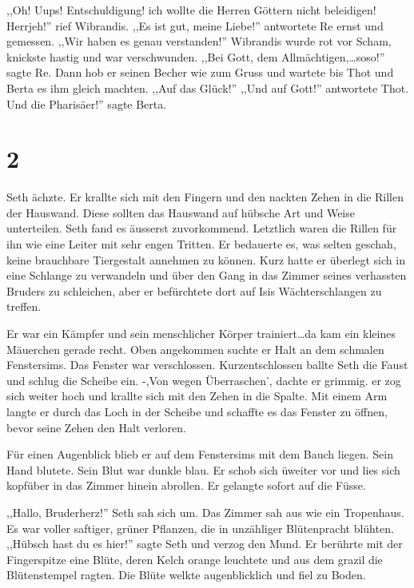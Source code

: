 \documentclass[11pt,titlepage,a5paper]{book}
\begin{document}
,,Oh! Uups! Entschuldigung! ich wollte die Herren Göttern nicht beleidigen! Herrjeh!'' rief Wibrandis. ,,Es ist gut, meine Liebe!'' antwortete Re ernst und gemessen. ,,Wir haben es genau verstanden!'' Wibrandis wurde rot vor Scham, knickste hastig und war verschwunden. ,,Bei Gott, dem Allmächtigen,\dots soso!'' sagte Re. Dann hob er seinen Becher wie zum Gruss und wartete bis Thot und Berta es ihm gleich machten. ,,Auf das Glück!'' ,,Und auf Gott!'' antwortete Thot. Und die Pharisäer!'' sagte Berta.

\section*{2}

Seth ächzte. Er krallte sich mit den Fingern und den nackten Zehen in die Rillen der Hauswand. Diese sollten das Hauswand auf hübsche Art und Weise unterteilen. Seth fand es äusserst zuvorkommend. Letztlich waren die Rillen für ihn wie eine Leiter mit sehr engen Tritten. Er bedauerte es, was selten geschah, keine brauchbare Tiergestalt annehmen zu können. Kurz hatte er überlegt sich in eine Schlange zu verwandeln und über den Gang in das Zimmer seines verhassten Bruders zu schleichen, aber er befürchtete dort auf Isis Wächterschlangen zu treffen.

Er war ein Kämpfer und sein menschlicher Körper trainiert\dots da kam ein kleines Mäuerchen gerade recht. Oben angekommen suchte er Halt an dem schmalen Fenstersims. Das Fenster war verschlossen. Kurzentschlossen ballte Seth die Faust und schlug die Scheibe ein. -,Von wegen Überraschen', dachte er grimmig. er zog sich weiter hoch und krallte sich mit den Zehen in die Spalte. Mit einem Arm langte er durch das Loch in der Scheibe und schaffte es das Fenster zu öffnen, bevor seine Zehen den Halt verloren.

Für einen Augenblick blieb er auf dem Fenstersims mit dem Bauch liegen. Sein Hand blutete. Sein Blut war dunkle blau. Er schob sich üweiter vor und lies sich kopfüber in das Zimmer hinein abrollen. Er gelangte sofort auf die Füsse.

,,Hallo, Bruderherz!'' Seth sah sich um. Das Zimmer sah aus wie ein Tropenhaus. Es war voller saftiger, grüner Pflanzen, die in unzähliger Blütenpracht blühten. ,,Hübsch hast du es hier!'' sagte Seth und verzog den Mund. Er berührte mit der Fingerspitze eine Blüte, deren Kelch orange leuchtete und aus dem grazil die Blütenstempel ragten. Die Blüte welkte augenblicklich und fiel zu Boden.
\end{document}
